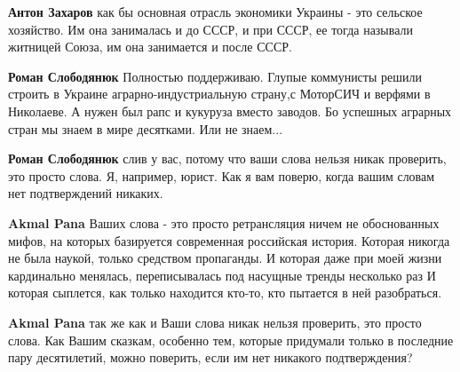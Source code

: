 \begin{itemize}
\begin{itemize}
 
\textbf{Антон Захаров} как бы основная отрасль экономики Украины - это сельское хозяйство. Им она занималась и до СССР, и при СССР, ее тогда называли житницей Союза, им она занимается и после СССР.

 
\textbf{Роман Слободянюк} Полностью поддерживаю. Глупые коммунисты решили строить в Украине аграрно-индустриальную страну,с МоторСИЧ и верфями в Николаеве. А нужен был рапс и кукуруза вместо заводов. Бо успешных аграрных стран мы знаем в мире десятками. Или не знаем...

 
\textbf{Роман Слободянюк} слив у вас, потому что ваши слова нельзя никак проверить, это просто слова. Я, например, юрист. Как я вам поверю, когда вашим словам нет подтверждений никаких.

 
\textbf{Akmal Pana} Ваших слова - это просто ретрансляция ничем не обоснованных мифов, на которых базируется современная российская история. Которая никогда не была наукой, только средством пропаганды. И которая даже при моей жизни кардинально менялась, переписывалась под насущные тренды несколько раз И которая сыплется, как только находится кто-то, кто пытается в ней разобраться.

 
\textbf{Akmal Pana} так же как и Ваши слова никак нельзя проверить, это просто слова. Как Вашим сказкам, особенно тем, которые придумали только в последние пару десятилетий, можно поверить, если им нет никакого подтверждения?


\end{itemize}
\end{itemize}
